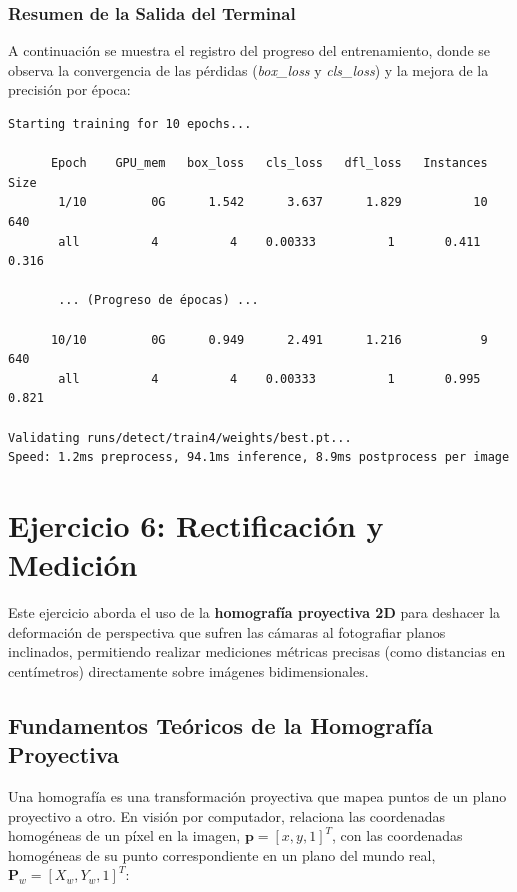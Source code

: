 \documentclass[12pt,a4paper]{article}
\begin{document}
\subsubsection{Resumen de la Salida del Terminal}

A continuación se muestra el registro del progreso del entrenamiento, donde se observa la convergencia de las pérdidas (\textit{box\_loss} y \textit{cls\_loss}) y la mejora de la precisión por época:

\begin{verbatim}
Starting training for 10 epochs...

      Epoch    GPU_mem   box_loss   cls_loss   dfl_loss   Instances      Size
       1/10         0G      1.542      3.637      1.829          10       640
       all          4          4    0.00333          1       0.411     0.316

       ... (Progreso de épocas) ...

      10/10         0G      0.949      2.491      1.216           9       640
       all          4          4    0.00333          1       0.995     0.821

Validating runs/detect/train4/weights/best.pt...
Speed: 1.2ms preprocess, 94.1ms inference, 8.9ms postprocess per image
\end{verbatim}

\newpage
\section{Ejercicio 6: Rectificación y Medición}

Este ejercicio aborda el uso de la \textbf{homografía proyectiva 2D} para deshacer la deformación de perspectiva que sufren las cámaras al fotografiar planos inclinados, permitiendo realizar mediciones métricas precisas (como distancias en centímetros) directamente sobre imágenes bidimensionales.

\subsection{Fundamentos Teóricos de la Homografía Proyectiva}

Una homografía es una transformación proyectiva que mapea puntos de un plano proyectivo a otro. En visión por computador, relaciona las coordenadas homogéneas de un píxel en la imagen, $\mathbf{p} = [x, y, 1]^T$, con las coordenadas homogéneas de su punto correspondiente en un plano del mundo real, $\mathbf{P}_w = [X_w, Y_w, 1]^T$:
\end{document}
